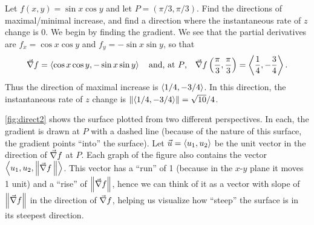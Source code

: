\begin{example}\label{ex_direct2}%
Let $f(x,y) = \sin x\cos y$ and let $P=(\pi/3,\pi/3)$. Find the directions of maximal/minimal increase, and find a direction where the instantaneous rate of $z$ change is 0.
\solution
We begin by finding the gradient. We see that the partial derivatives are $f_x = \cos x\cos y$ and $f_y = -\sin x\sin y$, so that
\[\vec\nabla f =\left\langle \cos x\cos y,-\sin x\sin y\right\rangle\quad \text{and, at $P$,} \quad \vec\nabla f\left(\frac{\pi}3,\frac{\pi}3\right) =\left\langle \frac14,-\frac34\right\rangle.\]
Thus the direction of maximal increase is $\left\langle 1/4, -3/4\right\rangle$. In this direction, the instantaneous rate of $z$ change is $\norm{\bracket{1/4,-3/4}} = \sqrt{10}/4%
$. 


\autoref{fig:direct2} shows the surface plotted from two different perspectives. In each, the gradient is drawn at $P$ with a dashed line (because of the nature of this surface, the gradient points ``into'' the surface). Let $\vec u =\left\langle u_1, u_2\right\rangle$ be the unit vector in the direction of $\vec\nabla f$ at $P$. Each graph of the figure also contains the vector $\left\langle u_1, u_2, \left\lVert \vec\nabla f\, \right\rVert\right\rangle$. This vector has a ``run'' of 1 (because in the $x$-$y$ plane it moves 1 unit) and a ``rise'' of $\left\lVert \vec\nabla f \right\rVert$, hence we can think of it as a vector with slope of $\left\lVert \vec\nabla f \right\rVert$ in the direction of $\vec\nabla f$, helping us visualize how ``steep'' the surface is in its steepest direction. 


\end{example}
